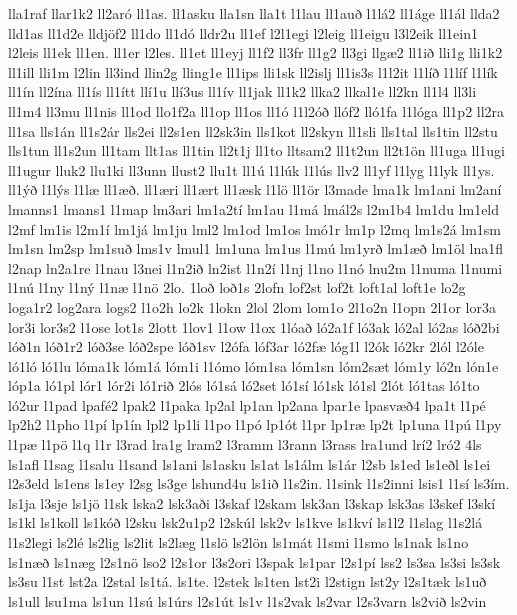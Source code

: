 {lla1raf
llar1k2
ll2aró
ll1as.
ll1asku
lla1sn
lla1t
l1lau
ll1auð
l1lá2
ll1áge
ll1ál
llda2
lld1as
ll1d2e
lldjöf2
ll1do
ll1dó
lldr2u
ll1ef
l2l1egi
l2leig
ll1eigu
l3l2eik
ll1ein1
l2leis
ll1ek
ll1en.
ll1er
l2les.
ll1et
ll1eyj
ll1f2
ll3fr
ll1g2
ll3gi
llgæ2
ll1ið
lli1g
lli1k2
ll1ill
lli1m
l2lin
ll3ind
llin2g
lling1e
ll1ips
lli1sk
ll2islj
ll1is3s
l1l2it
l1líð
l1líf
l1lík
ll1ín
ll2ína
ll1ís
ll1ítt
llí1u
llí3us
ll1ív
ll1jak
ll1k2
llka2
llkal1e
ll2kn
ll1l4
ll3li
ll1m4
ll3mu
ll1nis
ll1od
llo1f2a
ll1op
ll1os
ll1ó
l1l2óð
llóf2
lló1fa
l1lóga
ll1p2
ll2ra
ll1sa
lls1án
ll1s2ár
lls2ei
ll2s1en
ll2sk3in
lls1kot
ll2skyn
ll1sli
lls1tal
lls1tin
ll2stu
lls1tun
ll1s2un
ll1tam
llt1as
ll1tin
ll2t1j
ll1to
lltsam2
ll1t2un
ll2t1ön
ll1uga
ll1ugi
ll1ugur
lluk2
llu1ki
ll3unn
llust2
llu1t
ll1ú
l1lúk
l1lús
llv2
ll1yf
l1lyg
l1lyk
ll1ys.
ll1ýð
l1lýs
l1læ
ll1æð.
ll1æri
ll1ært
ll1æsk
l1lö
ll1ör
l3made
lma1k
lm1ani
lm2aní
lmanns1
lmans1
l1map
lm3ari
lm1a2tí
lm1au
l1má
lmál2s
l2m1b4
lm1du
lm1eld
l2mf
lm1is
l2m1í
lm1já
lm1ju
lml2
lm1od
lm1os
lmó1r
lm1p
l2mq
lm1s2á
lm1sm
lm1sn
lm2sp
lm1suð
lms1v
lmul1
lm1una
lm1us
l1mú
lm1yrð
lm1æð
lm1öl
lna1fl
l2nap
ln2a1re
l1nau
l3nei
l1n2ið
ln2ist
l1n2í
l1nj
l1no
l1nó
lnu2m
l1numa
l1numi
l1nú
l1ny
l1ný
l1næ
l1nö
2lo.
1loð
loð1s
2lofn
lof2st
lof2t
loft1al
loft1e
lo2g
loga1r2
log2ara
logs2
l1o2h
lo2k
1lokn
2lol
2lom
lom1o
2l1o2n
l1opn
2l1or
lor3a
lor3i
lor3s2
l1ose
lot1s
2lott
1lov1
l1ow
l1ox
1lóað
ló2a1f
ló3ak
ló2al
ló2as
lóð2bi
lóð1n
lóð1r2
lóð3se
lóð2spe
lóð1sv
l2ófa
lóf3ar
ló2fæ
lóg1l
l2ók
ló2kr
2lól
l2óle
ló1ló
ló1lu
lóma1k
lóm1á
lóm1i
l1ómo
lóm1sa
lóm1sn
lóm2sæt
lóm1y
ló2n
lón1e
lóp1a
ló1pl
lór1
lór2i
ló1rið
2lós
ló1sá
ló2set
ló1sí
ló1sk
ló1sl
2lót
ló1tas
ló1to
ló2ur
l1pad
lpafé2
lpak2
l1paka
lp2al
lp1an
lp2ana
lpar1e
lpasvæð4
lpa1t
l1pé
lp2h2
l1pho
l1pí
lp1ín
lpl2
lp1li
l1po
l1pó
lp1ót
l1pr
lp1ræ
lp2t
lp1una
l1pú
l1py
l1pæ
l1pö
l1q
l1r
l3rad
lra1g
lram2
l3ramm
l3rann
l3rass
lra1und
lrí2
lró2
4ls
ls1afl
l1sag
l1salu
l1sand
ls1ani
ls1asku
ls1at
ls1álm
ls1ár
l2sb
ls1ed
ls1eðl
ls1ei
l2s3eld
ls1ens
ls1ey
l2sg
ls3ge
lshund4u
ls1ið
l1s2in.
l1sink
l1s2inni
lsis1
l1sí
ls3ím.
ls1ja
l3sje
ls1jö
l1sk
lska2
lsk3aði
l3skaf
l2skam
lsk3an
l3skap
lsk3as
l3skef
l3skí
ls1kl
ls1koll
ls1kóð
l2sku
lsk2u1p2
l2skúl
lsk2v
ls1kve
ls1kví
ls1l2
l1slag
l1s2lá
l1s2legi
ls2lé
ls2lig
ls2lit
ls2læg
l1slö
ls2lön
ls1mát
l1smi
l1smo
ls1nak
ls1no
ls1næð
ls1næg
l2s1nö
lso2
l2s1or
l3s2ori
l3spak
ls1par
l2s1pí
lss2
ls3sa
ls3si
ls3sk
ls3su
l1st
lst2a
l2stal
ls1tá.
ls1te.
l2stek
ls1ten
lst2i
l2stign
lst2y
l2s1tæk
ls1uð
ls1ull
lsu1ma
ls1un
l1sú
ls1úrs
l2s1út
ls1v
l1s2vak
ls2var
l2s3varn
ls2við
ls2vin
}
